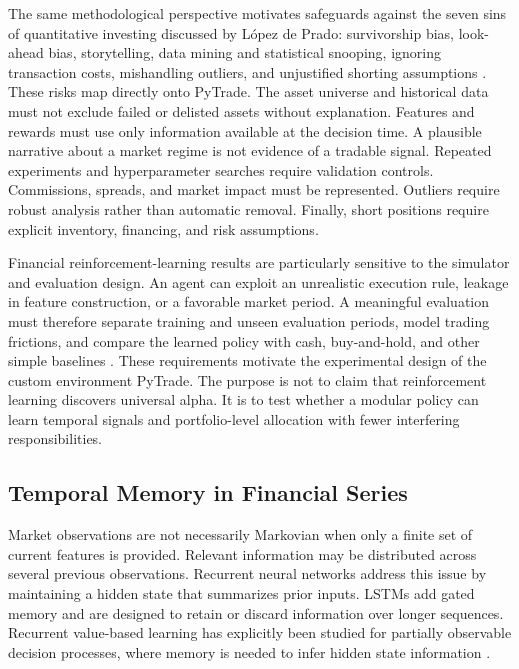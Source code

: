 The same methodological perspective motivates safeguards against the seven sins of quantitative investing discussed by López de Prado: survivorship bias, look-ahead bias, storytelling, data mining and statistical snooping, ignoring transaction costs, mishandling outliers, and unjustified shorting assumptions \cite{LopezdePrado.2018}. These risks map directly onto PyTrade. The asset universe and historical data must not exclude failed or delisted assets without explanation. Features and rewards must use only information available at the decision time. A plausible narrative about a market regime is not evidence of a tradable signal. Repeated experiments and hyperparameter searches require validation controls. Commissions, spreads, and market impact must be represented. Outliers require robust analysis rather than automatic removal. Finally, short positions require explicit inventory, financing, and risk assumptions.

Financial reinforcement-learning results are particularly sensitive to the simulator and evaluation design. An agent can exploit an unrealistic execution rule, leakage in feature construction, or a favorable market period. A meaningful evaluation must therefore separate training and unseen evaluation periods, model trading frictions, and compare the learned policy with cash, buy-and-hold, and other simple baselines \cite{LopezdePrado.2018}. These requirements motivate the experimental design of the custom environment PyTrade. The purpose is not to claim that reinforcement learning discovers universal alpha. It is to test whether a modular policy can learn temporal signals and portfolio-level allocation with fewer interfering responsibilities.

\subsection{Temporal Memory in Financial Series}


Market observations are not necessarily Markovian when only a finite set of current features is provided. Relevant information may be distributed across several previous observations. Recurrent neural networks address this issue by maintaining a hidden state that summarizes prior inputs. LSTMs add gated memory and are designed to retain or discard information over longer sequences. Recurrent value-based learning has explicitly been studied for partially observable decision processes, where memory is needed to infer hidden state information \cite{DBLP:journals/corr/HausknechtS15}.

